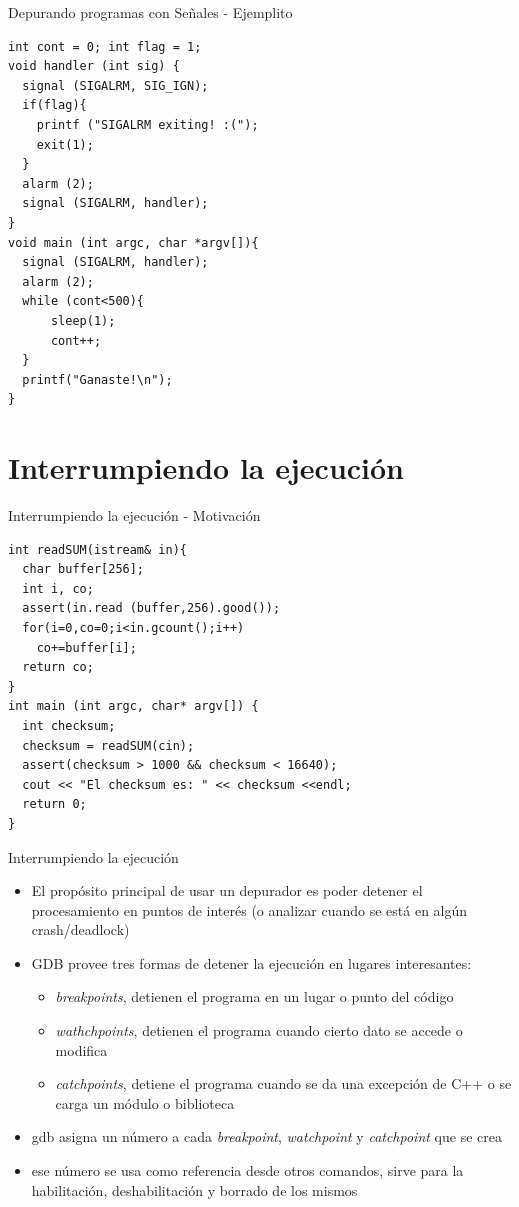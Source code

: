 \documentclass[xetex]{beamer}
\begin{document}
\begin{frame}[fragile]{Depurando programas con Señales - Ejemplito}
\begin{lstlisting}
int cont = 0; int flag = 1;
void handler (int sig) {
  signal (SIGALRM, SIG_IGN);
  if(flag){
    printf ("SIGALRM exiting! :(");
    exit(1);
  }
  alarm (2);
  signal (SIGALRM, handler);
}
void main (int argc, char *argv[]){
  signal (SIGALRM, handler);
  alarm (2);
  while (cont<500){
      sleep(1);
      cont++;
  }
  printf("Ganaste!\n");
}
\end{lstlisting}
\end{frame}



\section{Interrumpiendo la ejecución}

\begin{frame}[fragile]{Interrumpiendo la ejecución - Motivación}
\begin{lstlisting}
int readSUM(istream& in){
  char buffer[256];
  int i, co;
  assert(in.read (buffer,256).good());
  for(i=0,co=0;i<in.gcount();i++)
    co+=buffer[i];
  return co;
}
int main (int argc, char* argv[]) {
  int checksum;
  checksum = readSUM(cin);
  assert(checksum > 1000 && checksum < 16640);
  cout << "El checksum es: " << checksum <<endl;
  return 0;
}
\end{lstlisting}
\end{frame}


\begin{frame}[fragile]{Interrumpiendo la ejecución}
\begin{itemize}
\item El propósito principal de usar un depurador es poder detener el procesamiento en puntos de interés (o analizar cuando se está en algún crash/deadlock)
\item GDB provee tres formas de detener la ejecución en lugares interesantes:
\begin{itemize}
\item {\it breakpoints}, detienen el programa en un lugar o punto del código
\item {\it wathchpoints}, detienen el programa cuando cierto dato se accede o modifica
\item {\it catchpoints}, detiene el programa cuando se da una excepción de C++ o se carga un módulo o biblioteca
\end{itemize}
\item gdb asigna un número a cada {\it breakpoint}, {\it watchpoint} y {\it catchpoint} que se crea
\item ese número se usa como referencia desde otros comandos, sirve para la habilitación, deshabilitación y borrado de los mismos
\end{itemize}
\end{frame}
\end{document}
